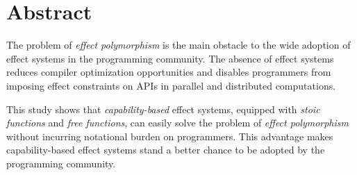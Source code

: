 \section*{\centering Abstract}

The problem of \emph{effect polymorphism} is the main obstacle to the
wide adoption of effect systems in the programming community. The
absence of effect systems reduces compiler optimization opportunities
and disables programmers from imposing effect constraints on APIs in
parallel and distributed computations.

This study shows that \emph{capability-based} effect systems, equipped
with \emph{stoic functions} and \emph{free functions}, can easily
solve the problem of \emph{effect polymorphism} without incurring
notational burden on programmers. This advantage makes
capability-based effect systems stand a better chance to be adopted by
the programming community.
